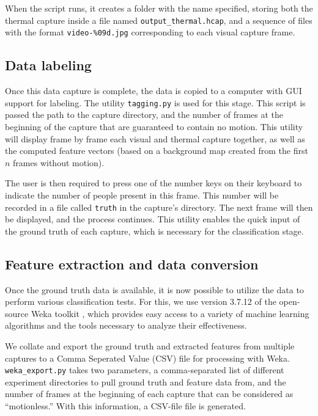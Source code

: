 \documentclass[../thesis/thesis.tex]{subfiles}
\begin{document}
When the script runs, it creates a folder with the name specified, storing both the thermal capture inside a file named \texttt{output\_thermal.hcap}, and a sequence of files with the format \texttt{video-\%09d.jpg} corresponding to each visual capture frame.

\subsection{Data labeling}
\label{subsec:datalabelling}
Once this data capture is complete, the data is copied to a computer with GUI support for labeling. The utility \texttt{tagging.py} is used for this stage. This script is passed the path to the capture directory, and the number of frames at the beginning of the capture that are guaranteed to contain no motion. This utility will display frame by frame each visual and thermal capture together, as well as the computed feature vectors (based on a background map created from the first $n$ frames without motion).

The user is then required to press one of the number keys on their keyboard to indicate the number of people present in this frame. This number will be recorded in a file called \texttt{truth} in the capture's directory. The next frame will then be displayed, and the process continues. This utility enables the quick input of the ground truth of each capture, which is necessary for the classification stage.

\subsection{Feature extraction and data conversion}

Once the ground truth data is available, it is now possible to utilize the data to perform various classification tests. For this, we use version 3.7.12 of the open-source Weka toolkit \cite{Weka}, which provides easy access to a variety of machine learning algorithms and the tools necessary to analyze their effectiveness.

We collate and export the ground truth and extracted features from multiple captures to a Comma Seperated Value (CSV) file for processing with Weka. \texttt{weka\_export.py} takes two parameters, a comma-separated list of different experiment directories to pull ground truth and feature data from, and the number of frames at the beginning of each capture that can be considered as ``motionless.'' With this information, a CSV-file file is generated.
\end{document}
